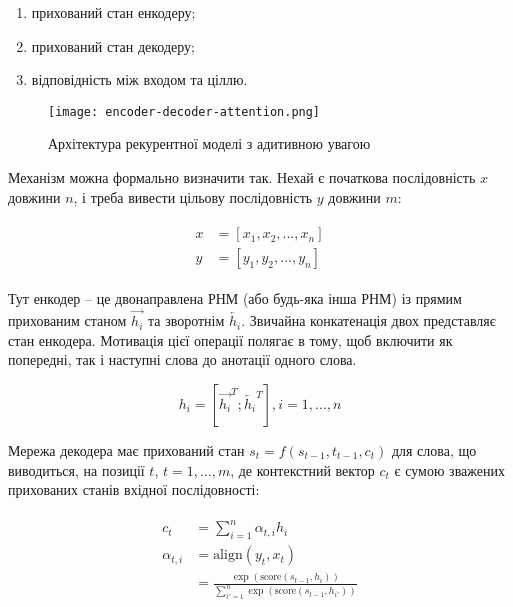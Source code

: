 \begin{enumerate}[label=--]
    \item прихований стан енкодеру;
    \item прихований стан декодеру;
    \item відповідність між входом та ціллю.
\end{enumerate}

\begin{figure}[H]
    \centering
    \texttt{[image: encoder-decoder-attention.png]}
    \caption{Архітектура рекурентної моделі з адитивною увагою}
    \label{fig:plot3}
\end{figure}

Механізм можна формально визначити так. Нехай є початкова послідовність
$x$ довжини $n$, і треба вивести цільову послідовність $y$
довжини $m$:

\vspace{0.5em}
\begin{gather}
\begin{aligned}
    x &= [x_1,x_2, ..., x_n] \\
    y &= [y_1,y_2, ..., y_n]
\end{aligned}
\end{gather}
\vspace{\baselineskip}

Тут енкодер -- це двонаправлена РНМ (або будь-яка інша РНМ) із прямим
прихованим станом $\overrightarrow{h_i}$ та зворотнім
$\overleftarrow{h_i}$. Звичайна конкатенація двох представляє стан
енкодера. Мотивація цієї операції
полягає в тому, щоб включити як попередні, так і наступні
слова до анотації одного слова.

\begin{equation}
    h_i = [\overrightarrow{h_i}^T;\overleftarrow{h_i}^T], i=1, ..., n
\end{equation}

Мережа декодера має прихований стан $s_t = f(s_{t-1},t_{t-1},c_t)$
для слова, що виводиться, на позиції $t$, $t = 1, ..., m$,
де контекстний вектор $c_t$ є сумою зважених прихованих станів
вхідної послідовності:

\vspace{0.5em}
\begin{gather}
\begin{aligned}
    c_t          &= \sum^n_{i=1}\alpha_{t,i} h_i \\
    \alpha_{t,i} &= \text{align}(y_t,x_t) \\
    &= \frac{\exp(\text{score}(s_{t-1}, h_i))}{\sum^n_{i'=1}\exp(\text{score}(s_{t-1},h_{i'}))}
\end{aligned}
\end{gather}
\vspace{\baselineskip}

